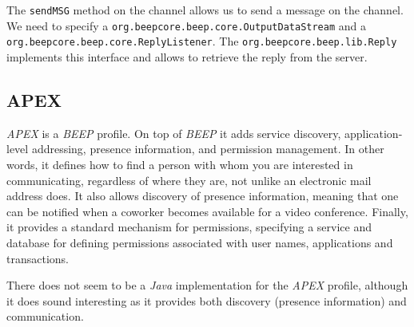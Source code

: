 The \texttt{sendMSG} method on the channel allows us to send a message on the channel. We need to specify a \texttt{org.beepcore.beep.core.OutputDataStream} and a \texttt{org.beepcore.beep.core.ReplyListener}. The \texttt{org.beepcore.beep.lib.Reply} implements this interface and allows to retrieve the reply from the server.


\subsection{APEX}
\emph{APEX} is a \emph{BEEP} profile. On top of \emph{BEEP} it adds service discovery, application-level addressing, presence information, and permission management. In other words, it defines how to find a person with whom you are interested in communicating, regardless of where they are, not unlike an electronic mail address does. It also allows discovery of presence information, meaning that one can be notified when a coworker becomes available for a video conference. Finally, it provides a standard mechanism for permissions, specifying a service and database for defining permissions associated with user names, applications and transactions.

There does not seem to be a \emph{Java} implementation for the \emph{APEX} profile, although it does sound interesting as it provides both discovery (presence information) and communication.

